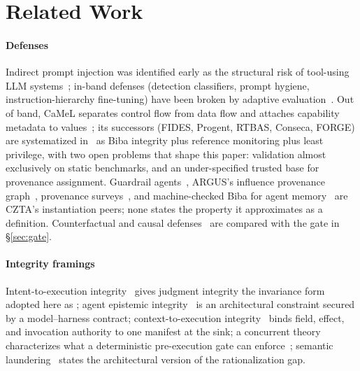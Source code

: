 \section{Related Work}
\label{sec:related}
\paragraph*{Defenses}
Indirect prompt injection was identified early as the structural risk
of tool-using LLM systems~\cite{greshake}; in-band defenses (detection
classifiers, prompt hygiene, instruction-hierarchy fine-tuning) have
been broken by adaptive evaluation~\cite{abdelnabi}. Out of band, CaMeL
separates control flow from data flow and attaches capability metadata
to values~\cite{camel}; its successors (FIDES, Progent, RTBAS, Conseca,
FORGE) are systematized in~\cite{oob} as Biba integrity plus reference
monitoring plus least privilege, with two open problems that shape this
paper: validation almost exclusively on static benchmarks, and an
under-specified trusted base for provenance assignment.
Guardrail agents~\cite{guardagent}, ARGUS's influence provenance
graph~\cite{argus}, provenance surveys~\cite{tracessurvey}, and
machine-checked Biba for agent memory~\cite{louck2026tmanm} are CZTA's
instantiation peers; none states the property it approximates as a
definition. Counterfactual and causal
defenses~\cite{melon,agentsentry,causalarmor,liao2026provenance,babu2026gistcmtf,pona2025acf}
are compared with the gate in \S\ref{sec:gate}.

\paragraph*{Integrity framings}
Intent-to-execution integrity~\cite{qu} gives judgment integrity the
invariance form adopted here as \Ifive; agent epistemic
integrity~\cite{shen} is an architectural constraint secured by a
model--harness contract; context-to-execution integrity~\cite{cxi}
binds field, effect, and invocation authority to one manifest at the
sink; a concurrent theory characterizes what a deterministic
pre-execution gate can enforce~\cite{ray2026enforced}; semantic
laundering~\cite{romanchuk2026semantic} states the architectural
version of the rationalization gap.

